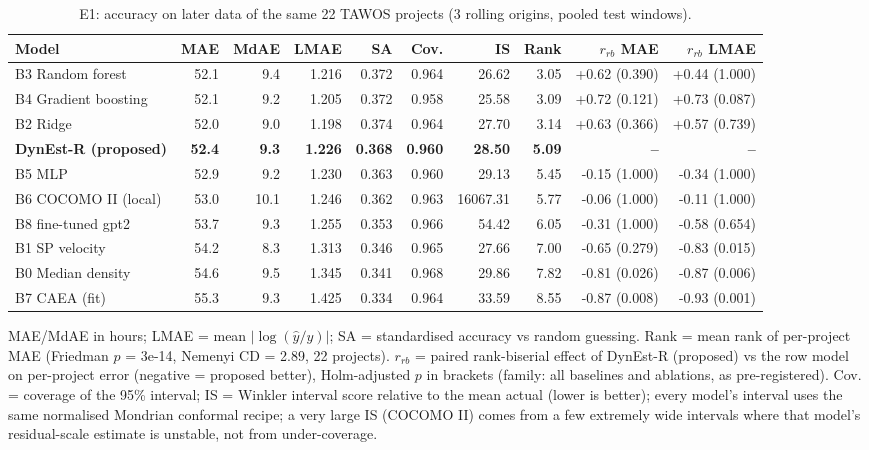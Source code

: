 \begin{table}[t]
\centering
\scriptsize
\caption{E1: accuracy on later data of the same 22 TAWOS projects (3 rolling origins, pooled test windows).}
\label{tab:e1}
\begin{tabular}{lrrrrrrrrr}
\toprule
Model & MAE & MdAE & LMAE & SA & Cov. & IS & Rank & $r_{rb}$ MAE & $r_{rb}$ LMAE \\
\midrule
B3 Random forest & 52.1 & 9.4 & 1.216 & 0.372 & 0.964 & 26.62 & 3.05 & +0.62 (0.390) & +0.44 (1.000) \\
B4 Gradient boosting & 52.1 & 9.2 & 1.205 & 0.372 & 0.958 & 25.58 & 3.09 & +0.72 (0.121) & +0.73 (0.087) \\
B2 Ridge & 52.0 & 9.0 & 1.198 & 0.374 & 0.964 & 27.70 & 3.14 & +0.63 (0.366) & +0.57 (0.739) \\
\textbf{DynEst-R (proposed)} & \textbf{52.4} & \textbf{9.3} & \textbf{1.226} & \textbf{0.368} & \textbf{0.960} & \textbf{28.50} & \textbf{5.09} & \textbf{--} & \textbf{--} \\
B5 MLP & 52.9 & 9.2 & 1.230 & 0.363 & 0.960 & 29.13 & 5.45 & -0.15 (1.000) & -0.34 (1.000) \\
B6 COCOMO II (local) & 53.0 & 10.1 & 1.246 & 0.362 & 0.963 & 16067.31 & 5.77 & -0.06 (1.000) & -0.11 (1.000) \\
B8 fine-tuned gpt2 & 53.7 & 9.3 & 1.255 & 0.353 & 0.966 & 54.42 & 6.05 & -0.31 (1.000) & -0.58 (0.654) \\
B1 SP velocity & 54.2 & 8.3 & 1.313 & 0.346 & 0.965 & 27.66 & 7.00 & -0.65 (0.279) & -0.83 (0.015) \\
B0 Median density & 54.6 & 9.5 & 1.345 & 0.341 & 0.968 & 29.86 & 7.82 & -0.81 (0.026) & -0.87 (0.006) \\
B7 CAEA (fit) & 55.3 & 9.3 & 1.425 & 0.334 & 0.964 & 33.59 & 8.55 & -0.87 (0.008) & -0.93 (0.001) \\
\bottomrule
\end{tabular}
\par\smallskip\parbox{0.95\linewidth}{\footnotesize MAE/MdAE in hours; LMAE = mean $|\log(\hat y/y)|$; SA = standardised accuracy vs random guessing. Rank = mean rank of per-project MAE (Friedman $p$ = 3e-14, Nemenyi CD = 2.89, 22 projects). $r_{rb}$ = paired rank-biserial effect of DynEst-R (proposed) vs the row model on per-project error (negative = proposed better), Holm-adjusted $p$ in brackets (family: all baselines and ablations, as pre-registered). Cov. = coverage of the 95\% interval; IS = Winkler interval score relative to the mean actual (lower is better); every model's interval uses the same normalised Mondrian conformal recipe; a very large IS (COCOMO II) comes from a few extremely wide intervals where that model's residual-scale estimate is unstable, not from under-coverage. }
\end{table}
